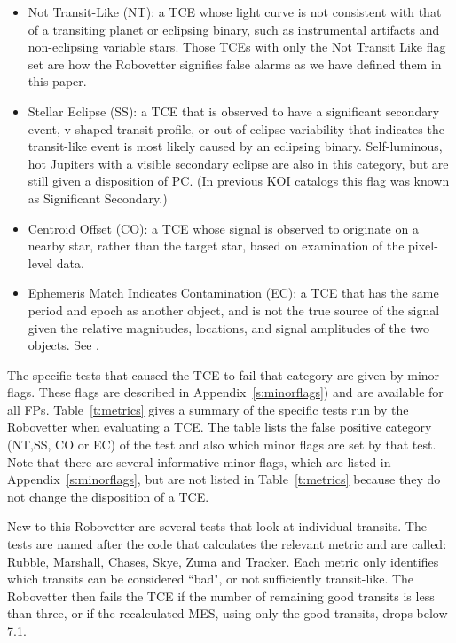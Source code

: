 \begin{itemize}
  \item Not Transit-Like (NT): a TCE whose light curve is not consistent with that of a transiting planet or eclipsing binary, such as instrumental artifacts and non-eclipsing variable stars. Those TCEs  with only the Not Transit Like flag set are how the Robovetter signifies false alarms as we have defined them in this paper. 
  \item  Stellar Eclipse (SS): a TCE that is observed to have a significant secondary event, v-shaped transit profile, or out-of-eclipse variability that indicates the transit-like event is most likely caused by an eclipsing binary. Self-luminous, hot Jupiters with a visible secondary eclipse are also in this category, but are still given a disposition of PC. (In previous KOI catalogs this flag was known as Significant Secondary.)
  \item Centroid Offset (CO): a TCE whose signal is observed to originate on a nearby star, rather than the target star, based on examination of the pixel-level data.
  \item Ephemeris Match Indicates Contamination (EC): a TCE that has the same period and epoch as another object, and is not the true source of the signal given the relative magnitudes, locations, and signal amplitudes of the two objects. See \citet{Coughlin2014}.
\end{itemize}

The specific tests that caused the TCE to fail that category are given by minor flags. These flags are described in Appendix~\ref{s:minorflags}) and are available for all FPs.  Table~\ref{t:metrics} gives a summary of the specific tests run by the Robovetter when evaluating a TCE.  The table lists the false positive category (NT,SS, CO or EC) of the test and also which minor flags are set by that test.  Note that there are several informative minor flags, which are listed in Appendix~\ref{s:minorflags}, but are not listed in Table~\ref{t:metrics} because they do not change the disposition of a TCE.

New to this Robovetter are several tests that look at individual transits. The tests are named after the code that calculates the relevant metric and are called: Rubble, Marshall, Chases, Skye, Zuma and Tracker.  Each metric only identifies which transits can be considered ``bad", or not sufficiently transit-like.  The Robovetter then fails the TCE if the number of remaining good transits is less than three, or if the recalculated MES, using only the good transits, drops below 7.1.

